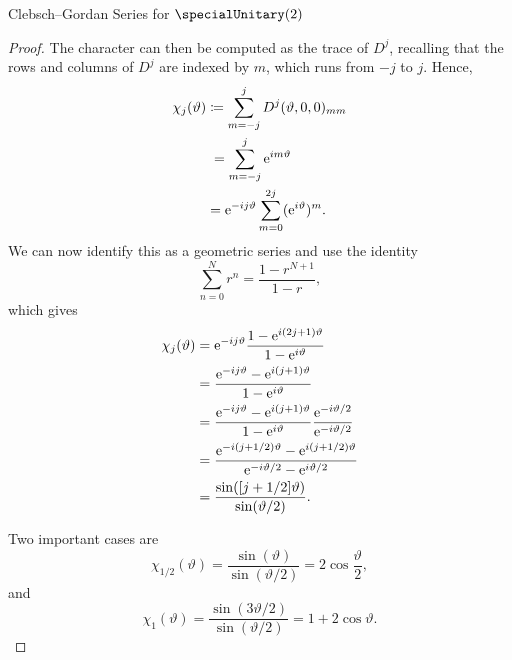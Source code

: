 \begin{thm}{Clebsch--Gordan Series for \(\specialUnitary(2)\)}{}
\begin{proof}
        The character can then be computed as the trace of \(D^j\), recalling that the rows and columns of \(D^j\) are indexed by \(m\), which runs from \(-j\) to \(j\).
        Hence,
        \begin{align}
            \chi_j(\vartheta) &\coloneqq \sum_{m = -j}^{j} D^j(\vartheta, 0, 0)_{mm}\\
            &\hphantom{:}= \sum_{m = -j}^{j} \mathrm{e}^{im\vartheta}\\
            &= \mathrm{e}^{-ij\vartheta} \sum_{m = 0}^{2j} (\mathrm{e}^{i\vartheta})^{m}.
        \end{align}
        We can now identify this as a geometric series and use the identity
        \begin{equation}
            \sum_{n = 0}^{N} r^n = \frac{1 - r^{N + 1}}{1 - r},
        \end{equation}
        which gives
        \begin{align}
            \chi_j(\vartheta) &= \mathrm{e}^{-ij\vartheta} \frac{1 - \mathrm{e}^{i(2j + 1)\vartheta}}{1 - \mathrm{e}^{i\vartheta}}\\
            &= \frac{\mathrm{e}^{-ij\vartheta} - \mathrm{e}^{i(j + 1)\vartheta}}{1 - \mathrm{e}^{i\vartheta}}\\
            &= \frac{\mathrm{e}^{-ij\vartheta} - \mathrm{e}^{i(j + 1)\vartheta}}{1 - \mathrm{e}^{i\vartheta}}\frac{\mathrm{e}^{-i\vartheta/2}}{\mathrm{e}^{-i\vartheta/2}}\\
            &= \frac{\mathrm{e}^{-i(j + 1/2)\vartheta} - \mathrm{e}^{i(j + 1/2)\vartheta}}{\mathrm{e}^{-i\vartheta/2} - \mathrm{e}^{i\vartheta/2}}\\
            &= \frac{\sin([j + 1/2]\vartheta)}{\sin(\vartheta/2)}.
        \end{align}
        
        Two important cases are
        \begin{equation}
            \chi_{1/2}(\vartheta) = \frac{\sin(\vartheta)}{\sin(\vartheta/2)} = 2\cos\frac{\vartheta}{2},
        \end{equation}
        and
        \begin{equation}
            \chi_1(\vartheta) = \frac{\sin(3\vartheta/2)}{\sin(\vartheta/2)} = 1 + 2\cos\vartheta.
        \end{equation}
        

\end{proof}
\end{thm}
